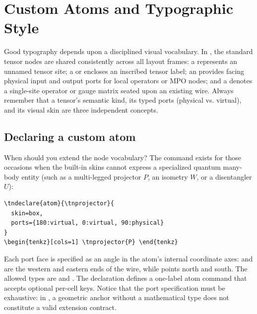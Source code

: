 \section{Custom Atoms and Typographic Style}\label{ch:house}

Good typography depends upon a disciplined visual vocabulary.  In \pkg{}, the
standard tensor nodes are shared consistently across all layout frames: a
 represents an unnamed tensor site; a  or 
encloses an inscribed tensor label; an  provides facing physical input
and output ports for local operators or MPO nodes; and a  denotes a
single-site operator or gauge matrix seated upon an existing wire.  Always
remember that a tensor's semantic kind, its typed ports (physical vs. virtual),
and its visual skin are three independent concepts.

\subsection{Declaring a custom atom}

When should you extend the node vocabulary?  The command 
exists for those occasions when the built-in skins cannot express a specialized
quantum many-body entity (such as a multi-legged projector $P$, an isometry
$W$, or a disentangler $U$):


\begin{Verbatim}[fontsize=\small,frame=leftline]
\tndeclare{atom}{\tnprojector}{
  skin=box,
  ports={180:virtual, 0:virtual, 90:physical}
}
\begin{tenkz}[cols=1] \tnprojector{P} \end{tenkz}
\end{Verbatim}

Each port face is specified as an angle in the atom's internal coordinate axes:
 and  are the western and eastern ends of the wire, while
 points north and  south.  The allowed types are
 and .  The declaration defines a one-label atom
command that accepts optional per-cell keys.  Notice that the port specification
must be exhaustive: in \pkg{}, a geometric anchor without a mathematical type
does not constitute a valid extension contract.

